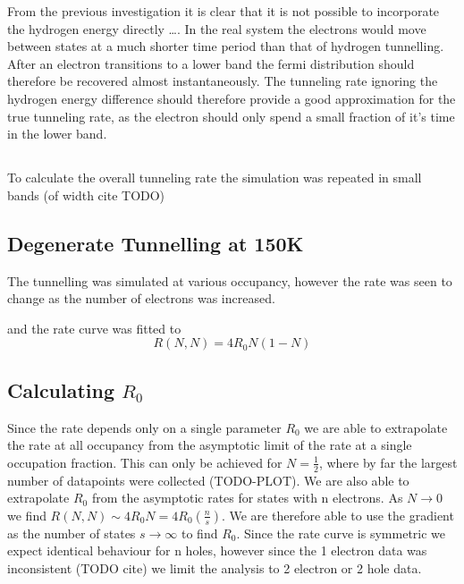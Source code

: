 
From the previous investigation it is clear
that it is not possible to incorporate the
hydrogen energy directly \ldots. In the
real system the electrons would move
between states at a much shorter time
period than that of hydrogen tunnelling.
After an electron transitions to a lower
band the fermi distribution should therefore
be recovered almost instantaneously.
The tunneling rate ignoring the
hydrogen energy difference should
therefore provide a good approximation
for the true tunneling rate, as the
electron should only spend a small
fraction of it's time in the lower band.

\subsection{}
To calculate the overall tunneling rate
the simulation was repeated in small
bands (of width cite TODO)




\subsection{Degenerate Tunnelling at 150K}
The tunnelling was simulated at various occupancy,
however the rate was seen to change as the
number of electrons was increased.

and the rate curve was fitted to
\begin{equation}
    R(N,N) = 4 R_0 N(1-N)\label{eqn:degenerate tunnelling rate}
\end{equation}

\subsection{Calculating \(R_0\)}
Since the rate depends only on a single
parameter \(R_0\) we are able to
extrapolate the rate at all
occupancy from the asymptotic
limit of the rate at a single
occupation fraction. This can
only be achieved for
\(N=\frac{1}{2}\), where
by far the largest number of
datapoints were collected (TODO-PLOT).
We are also able to extrapolate
\(R_0\) from the asymptotic
rates for states with n electrons.
As \(N\rightarrow{}0\)
we find
\(R(N,N) \sim{} 4 R_0 N = 4R_0 (\frac{n}{s})\).
We are therefore able to
use the gradient as the
number of states \(s\rightarrow{}\infty{}\)
to find \(R_0\).
Since the rate curve
is symmetric we expect
identical behaviour for
n holes, however
since the 1 electron
data was inconsistent (TODO cite)
we limit the analysis to 2 electron
or 2 hole data.

